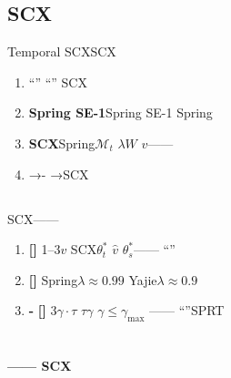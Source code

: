 \documentclass[11pt,a4paper]{article}
\theoremstyle{remark}
\newcommand{\heuristic}{\textnormal{\textbf{[]}}}
\begin{document}
\subsection{SCX}

Temporal SCXSCX

\begin{enumerate}[label=(\arabic*)]
    \item \textbf{}``''
          ``''
          SCX
          
    \item \textbf{Spring SE-1}Spring SE-1\textbf{}
          \textbf{}Spring
    \item \textbf{SCX}Spring$\mathcal{M}_t$
          $\lambda$$W$
          $v$——
    \item \textbf{}\textbf{}
          →-\textbf{}
          →SCX
\end{enumerate}

\subsection{}

SCX——


\begin{enumerate}[label=\textbf{\,\arabic*:}, leftmargin=*]

    \item \textbf{}
          \heuristic{} 1--3$v$
          SCX$\theta_t^*$
          $\hat{v}$
          \textbf{}$\theta_s^*$——
          ``''

    \item \textbf{}
          \heuristic{} 
          Spring$\lambda \approx 0.99$
          Yajie$\lambda \approx 0.9$
          
          \textbf{}

    \item \textbf{-}
          \heuristic{} 3$\gamma \cdot \tau$
          $\tau$$\gamma$
          $\gamma \leq \gamma_{\max}$
          \textbf{}——
          ``''SPRT

\end{enumerate}

\section{}

\textbf{——
SCX}
\end{document}
